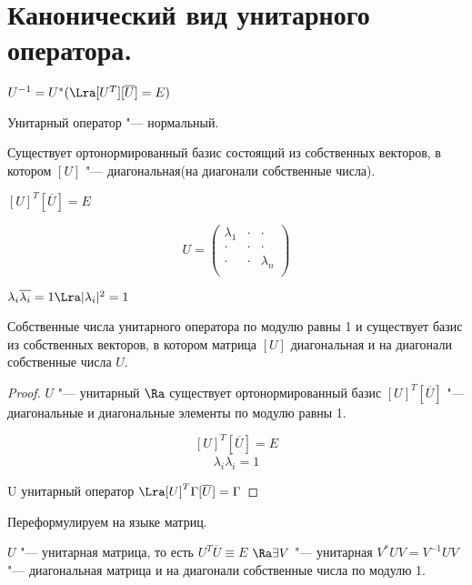 ﻿\section{Канонический вид унитарного оператора.}

$U^{-1} = U^* (\Lra [U^{T}][\overline{U}] = E)$  

Унитарный оператор "--- нормальный. 

Существует ортонормированный базис состоящий из собственных векторов, в котором $[U]$ "--- диагональная(на диагонали собственные числа). 

$[U]^T[\overline{U}] = E$

$$U = \begin{pmatrix}
\lambda_1 & \cdot & \cdot \\
\cdot & \cdot &\cdot\\
\cdot & \cdot &\lambda_n\\
\end{pmatrix}$$

$\lambda_i \overline{\lambda_i} = 1 \Lra |\lambda_i|^2 = 1$

\begin{theorem}{}
 Собственные числа унитарного оператора по модулю равны 1 и 
 существует базис из собственных векторов, в котором матрица $[U]$ диагональная и 
 на диагонали собственные числа $U$.
\end{theorem} 

\begin{proof}
$U$ "--- унитарный $\Ra$ существует ортонормированный базис $[U]^T[\overline{U}]$ "--- диагональные и диагональные элементы 
по модулю равны 1.

$$[U]^T[\overline{U}] = E$$
$$\lambda_i \overline{\lambda_i} = 1$$

U унитарный оператор $\Lra [U]^T\Gamma[\overline{U}] = \Gamma$
\end{proof}

Переформулируем на языке матриц. 

$U$ "--- унитарная матрица, то есть $U^T\overline{U} \equiv E$ 
$\Ra \exists V$ "--- унитарная $V^*UV = V^{-1}UV$ "--- диагональная матрица и на диагонали собственные числа по модулю 1.


